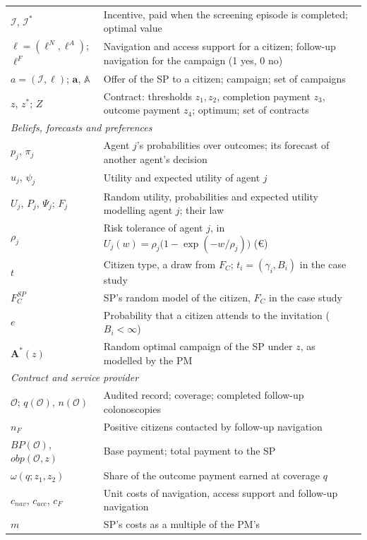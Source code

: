 \documentclass[12pt]{article}
\begin{document}
{\begin{longtable}{l p{13.2cm}}
$\mathcal{I}$, $\mathcal{I}^*$ & Incentive, paid when the screening episode is completed; optimal value \\
$\ell = (\ell^{N}, \ell^{A})$; $\ell^{F}$ & Navigation and access support for a citizen; follow-up navigation for the campaign (1 yes, 0 no) \\
$a = (\mathcal{I}, \ell)$; $\mathbf{a}$, $\mathbb{A}$ & Offer of the SP to a citizen; campaign; set of campaigns \\
$z$, $z^*$; $Z$ & Contract: thresholds $z_1, z_2$, completion payment $z_3$, outcome payment $z_4$; optimum; set of contracts \\
\midrule
\multicolumn{2}{l}{\emph{Beliefs, forecasts and preferences}} \\
$p_j$, $\pi_j$ & Agent $j$'s probabilities over outcomes; its forecast of another agent's decision \\
$u_j$, $\psi_j$ & Utility and expected utility of agent $j$ \\
$U_j$, $P_j$, $\Psi_j$; $F_j$ & Random utility, probabilities and expected utility modelling agent $j$; their law \\
$\rho_j$ & Risk tolerance of agent $j$, in $U_j(w) = \rho_j\big(1 - \exp(-w/\rho_j)\big)$ (€) \\
$t$ & Citizen type, a draw from $F_C$; $t_i = (\gamma_i, B_i)$ in the case study \\
$F_C^{SP}$ & SP's random model of the citizen, $F_C$ in the case study \\
$e$ & Probability that a citizen attends to the invitation ($B_i < \infty$) \\
$\mathbf{A}^*(z)$ & Random optimal campaign of the SP under $z$, as modelled by the PM \\
\midrule
\multicolumn{2}{l}{\emph{Contract and service provider}} \\
$\mathcal{O}$; $q(\mathcal{O})$, $n(\mathcal{O})$ & Audited record; coverage; completed follow-up colonoscopies \\
$n_F$ & Positive citizens contacted by follow-up navigation \\
$BP(\mathcal{O})$, $obp(\mathcal{O}, z)$ & Base payment; total payment to the SP \\
$\omega(q; z_1, z_2)$ & Share of the outcome payment earned at coverage $q$ \\
$c_{nav}$, $c_{acc}$, $c_F$ & Unit costs of navigation, access support and follow-up navigation \\
$m$ & SP's costs as a multiple of the PM's \\

\end{longtable}}
\end{document}

